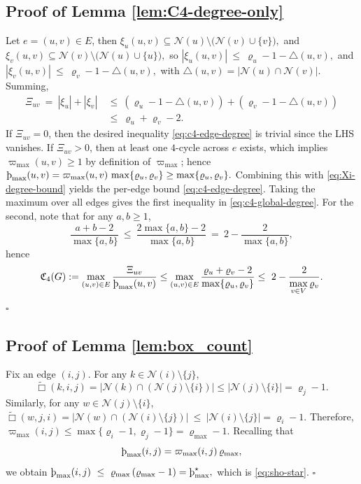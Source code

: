 \documentclass[twoside,11pt]{article}
\numberwithin{equation}{section}
\numberwithin{theorem}{section}
\numberwithin{example}{section}
\newcommand{\sho}{\textup{\text{\th}}}
\begin{document}
\subsection{Proof of Lemma \ref{lem:C4-degree-only}}
Let $e=(u,v)\in E$, then 
\( 
\xi_u(u,v)\subseteq \mathcal N(u)\setminus\bigl(\mathcal N(v)\cup\{v\}\bigr),\) and \(
\xi_v(u,v)\subseteq \mathcal N(v)\setminus\bigl(\mathcal N(u)\cup\{u\}\bigr), 
\)
so 
\( 
|\xi_u(u,v)|\ \le\ \varrho_u-1-\triangle(u,v), 
\) and \(
|\xi_v(u,v)|\ \le\ \varrho_v-1-\triangle(u,v), 
\)
with $\triangle(u,v)=|\mathcal N(u)\cap\mathcal N(v)|$. Summing, \begin{align} 
\label{eq:Xi-degree-triangle-bound} 
\Xi_{uv}\ =\ |\xi_u|+|\xi_v| \ 
&\le\ \left(\varrho_u-1-\triangle(u,v)\right)+\left(\varrho_v-1-\triangle(u,v)\right)\\ 
\label{eq:Xi-degree-bound} 
\ &\le\ \varrho_u+\varrho_v-2. 
\end{align} 
If $\Xi_{uv}=0$, then the desired inequality \eqref{eq:c4-edge-degree} is trivial since the LHS vanishes. If $\Xi_{uv}>0$, then at least one $4$-cycle across $e$ exists, which implies $\varpi_{\max}(u,v)\ge 1$ by definition of $\varpi_{\max}$; hence 
\( 
\sho_{\max}(u,v) = \varpi_{\max}(u,v)\,\max\{\varrho_u,\varrho_v\} \ge \max\{\varrho_u,\varrho_v\}. 
\) 
Combining this with \eqref{eq:Xi-degree-bound} yields the per-edge bound \eqref{eq:c4-edge-degree}. Taking the maximum over all edges gives the first inequality in \eqref{eq:c4-global-degree}. For the second, note that for any $a,b\ge 1$, 
\[ 
\frac{a+b-2}{\max\{a,b\}}\ \le\ \frac{2\max\{a,b\}-2}{\max\{a,b\}}\ =\ 2-\frac{2}{\max\{a,b\}}, 
\] hence 
\[ 
\mathfrak C_4(G):=\max_{(u,v)\in E}\frac{\Xi_{uv}}{\sho_{\max}(u,v)} \le\max_{(u,v)\in E} \frac{\varrho_u+\varrho_v-2}{\max\{\varrho_u,\varrho_v\}} \le\ 2-\frac{2}{\displaystyle\max_{v\in V}\varrho_v}. 
\] 
\hfill$\square$


\subsection{Proof of Lemma \ref{lem:box_count}}
Fix an edge $(i,j)$. For any $k\in\mathcal N(i)\setminus\{j\}$,
\[
\widetilde\Box(k,i,j)
= \bigl|\mathcal N(k)\cap(\mathcal N(j)\setminus\{i\})\bigr|
 \le |\mathcal N(j)\setminus\{i\}|
= \varrho_j-1.
\]
Similarly, for any $w\in\mathcal N(j)\setminus\{i\}$,
\(
\widetilde\Box(w,j,i)
= \bigl|\mathcal N(w)\cap(\mathcal N(i)\setminus\{j\})\bigr|
\ \le\ |\mathcal N(i)\setminus\{j\}|
= \varrho_i-1.
\)
Therefore,
\(
\varpi_{\max}(i,j)
\le \max\{\varrho_i-1,\varrho_j-1\}
= \varrho_{\max}-1.
\)
Recalling that
\[
\sho_{\max}(i,j)=\varpi_{\max}(i,j)\,\varrho_{\max},
\]
we obtain
\(
\sho_{\max}(i,j)\ \le\ \varrho_{\max}\,(\varrho_{\max}-1)
= \sho^\star_{\max},
\)
which is \eqref{eq:sho-star}.
\hfill $\square$
\end{document}

